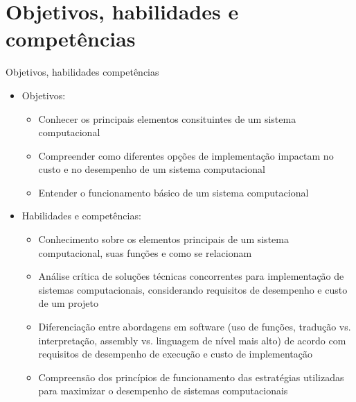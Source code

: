     \section[slide=true]{Objetivos, habilidades e competências}
      \begin{slide}[toc=]{Objetivos, habilidades competências}
         \begin{itemize}
            \item Objetivos:
		    \begin{itemize}
			    \item Conhecer os principais elementos consituintes de um sistema computacional
			    \item Compreender como diferentes opções de implementação impactam no custo e no desempenho de um sistema computacional
			    \item Entender o funcionamento básico de um sistema computacional
		    \end{itemize}
	     \item Habilidades e competências:
		     \begin{itemize}
			     \item Conhecimento sobre os elementos principais de um sistema computacional, suas funções e como se relacionam
			     \item Análise crítica de soluções técnicas concorrentes para implementação de sistemas computacionais, considerando requisitos de desempenho e custo de um projeto
			     \item Diferenciação entre abordagens em software (uso de funções, tradução vs. interpretação, assembly vs. linguagem de nível mais alto) de acordo com requisitos de desempenho de execução e custo de implementação
			     \item Compreensão dos princípios de funcionamento das estratégias utilizadas para maximizar o desempenho de sistemas computacionais
	            \end{itemize}
         \end{itemize}
      \end{slide}


